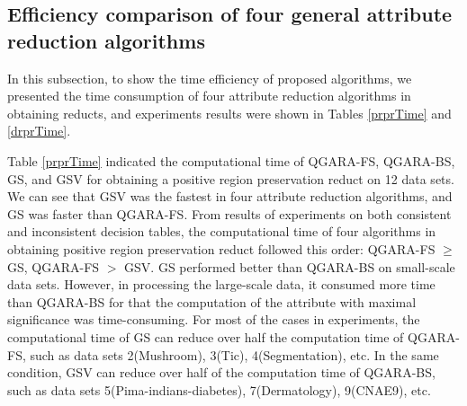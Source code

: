 \documentclass[review]{elsarticle}
\begin{document}
	\subsection{Efficiency comparison of four general attribute reduction algorithms}
		\par In this subsection, to show the time efficiency of proposed algorithms, we presented the time consumption of four attribute reduction algorithms in obtaining reducts, and experiments results were shown in Tables \ref{prprTime} and \ref{drprTime}.
		\par Table \ref{prprTime} indicated the computational time of QGARA-FS, QGARA-BS, GS, and GSV for obtaining a positive region preservation reduct on 12 data sets. We can see that GSV was the fastest in four attribute reduction algorithms, and GS was faster than QGARA-FS. From results of experiments on both consistent and inconsistent decision tables, the computational time of four algorithms in obtaining positive region preservation reduct followed this order: QGARA-FS $\geq$ GS, QGARA-FS $> $ GSV. GS performed better than QGARA-BS on small-scale data sets. However, in processing the large-scale data, it consumed more time than QGARA-BS for that the computation of the attribute with maximal significance was time-consuming. For most of the cases in experiments, the computational time of GS can reduce over half the computation time of QGARA-FS, such as data sets 2(Mushroom), 3(Tic), 4(Segmentation), etc. In the same condition, GSV can reduce over half of the computation time of QGARA-BS, such as data sets 5(Pima-indians-diabetes), 7(Dermatology), 9(CNAE9), etc.
\end{document}
